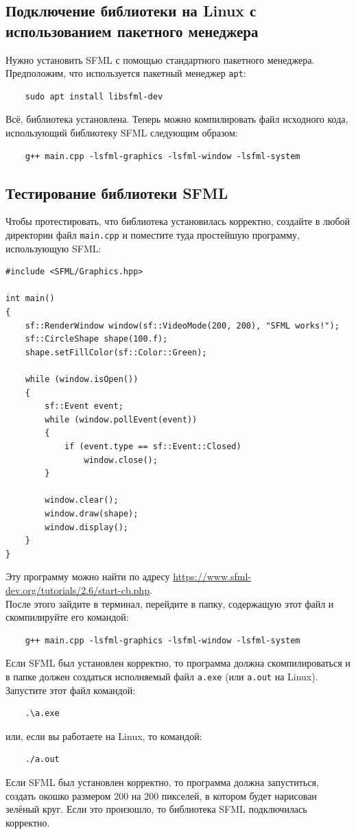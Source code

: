\documentclass{article}
\begin{document}
\subsection*{Подключение библиотеки на Linux с использованием пакетного менеджера}
Нужно установить SFML с помощью стандартного пакетного менеджера. Предположим, что используется пакетный менеджер \texttt{apt}:
\begin{verbatim}
    sudo apt install libsfml-dev
\end{verbatim}
Всё, библиотека установлена. Теперь  можно компилировать файл исходного кода, использующий библиотеку SFML следующим образом:
\begin{verbatim}
    g++ main.cpp -lsfml-graphics -lsfml-window -lsfml-system
\end{verbatim}



\subsection*{Тестирование библиотеки SFML}
Чтобы протестировать, что библиотека установилась корректно, создайте в любой директории файл \texttt{main.cpp} и поместите туда простейшую программу, использующую SFML:
\begin{lstlisting}
#include <SFML/Graphics.hpp>

int main()
{
    sf::RenderWindow window(sf::VideoMode(200, 200), "SFML works!");
    sf::CircleShape shape(100.f);
    shape.setFillColor(sf::Color::Green);

    while (window.isOpen())
    {
        sf::Event event;
        while (window.pollEvent(event))
        {
            if (event.type == sf::Event::Closed)
                window.close();
        }

        window.clear();
        window.draw(shape);
        window.display();
    }
}
\end{lstlisting}
Эту программу можно найти по адресу \href{https://www.sfml-dev.org/tutorials/2.6/start-cb.php}{https://www.sfml-dev.org/tutorials/2.6/start-cb.php}.\\
После этого зайдите в терминал, перейдите в папку, содержащую этот файл и скомпилируйте его командой:
\begin{verbatim}
    g++ main.cpp -lsfml-graphics -lsfml-window -lsfml-system
\end{verbatim}
Если SFML был установлен корректно, то программа должна скомпилироваться и в папке должен создаться исполняемый файл \texttt{a.exe} (или \texttt{a.out} на Linux). Запустите этот файл командой:
\begin{verbatim}
    .\a.exe
\end{verbatim}
или, если вы работаете на Linux, то командой:
\begin{verbatim}
    ./a.out
\end{verbatim}
Если SFML был установлен корректно, то программа должна запуститься, создать окошко размером 200 на 200 пикселей, в котором будет нарисован зелёный круг. Если это произошло, то библиотека SFML подключилась корректно.
\end{document}
